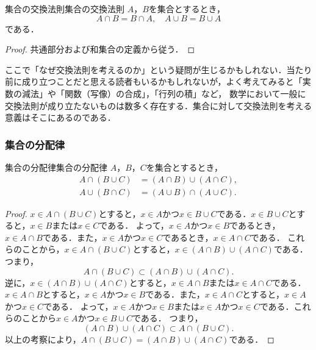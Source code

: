 \documentclass[a4paper,11pt]{ltjsarticle}
\newenvironment{tleftbar}{\begin{tbleftline}\setlength{\parindent}{1\zw}}{\end{tbleftline}}
\begin{document}
        \begin{prop}{集合の交換法則}{集合の交換法則}
          $A$，$B$を集合とするとき，
          \[
          A \cap B = B \cap A , \quad A \cup B = B \cup A
          \]
          である．
        \end{prop}

        \begin{tleftbar}
        \begin{proof}
          共通部分および和集合の定義から従う．
        \end{proof}
      \end{tleftbar}

        ここで「なぜ交換法則を考えるのか」という疑問が生じるかもしれない．当たり前に成り立つことだと思える読者もいるかもしれないが，よく考えてみると「実数の減法」や「関数（写像）の合成」，「行列の積」など，
        数学において一般に交換法則が成り立たないものは数多く存在する．集合に対して交換法則を考える意義はそこにあるのである．
      
        \subsubsection{集合の分配律}

        \begin{prop}{集合の分配律}{集合の分配律}
          $A$，$B$，$C$を集合とするとき，
          \begin{align*} 
            A \cap ( B \cup C) &= (A \cap B) \cup (A \cap C), \\
            A \cup ( B \cap C) &= (A \cup B) \cap (A \cup C).
          \end{align*}
        \end{prop}
        
        \begin{tleftbar}
        \begin{proof}
        $ x \in A \cap ( B \cup C)$とすると，$x \in A$かつ$x \in B \cup C$である．$x \in B \cup C$とすると，$x \in B$または$x \in C$である．
        よって，$x \in A$かつ$x \in B$であるとき，$x \in A \cap B$である．また，$x \in A$かつ$x \in C$であるとき，$x \in A \cap C$である．
        これらのことから，$x \in A \cap ( B \cup C)$とすると，$x \in (A \cap B) \cup (A \cap C)$である．
        つまり，
        \[
        A \cap ( B \cup C) \subset (A \cap B) \cup (A \cap C).
        \]
        逆に，$x \in (A \cap B) \cup (A \cap C)$とすると，$x \in A \cap B$または$x \in A \cap C$である．
        $x \in A \cap B$とすると，$x \in A$かつ$x \in B$である．また，$x \in A \cap C$とすると，$x \in A$かつ$x \in C$である．
        よって，$x \in A$かつ$x \in B$または$x \in A$かつ$x \in C$である．これらのことから$x \in A$かつ$x \in B \cup C$である．
        つまり，
        \[
        (A \cap B) \cup (A \cap C) \subset A \cap ( B \cup C).
        \]
        以上の考察により，$A \cap ( B \cup C) = (A \cap B) \cup (A \cap C)$である．
      \end{proof}
      \end{tleftbar}
        
\end{document}
